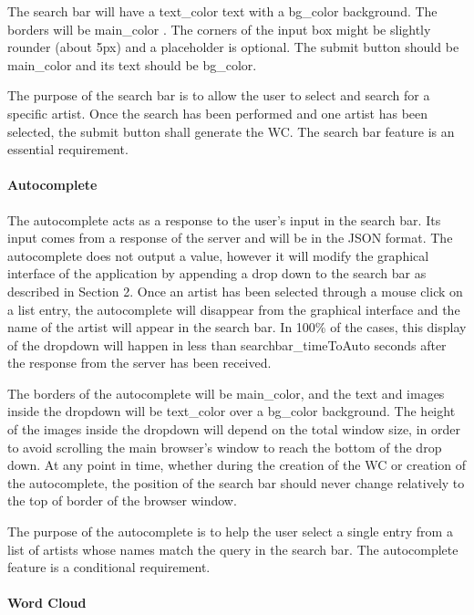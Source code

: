 \documentclass[]{article}
\begin{document}
The search bar will have a text\_color text with a bg\_color background.
The borders will be main\_color . The corners of the input box might be
slightly rounder (about 5px) and a placeholder is optional. The submit
button should be main\_color and its text should be bg\_color.

The purpose of the search bar is to allow the user to select and search
for a specific artist. Once the search has been performed and one artist
has been selected, the submit button shall generate the WC. The search
bar feature is an essential requirement.

\paragraph{Autocomplete}\label{autocomplete}

The autocomplete acts as a response to the user's input in the search
bar. Its input comes from a response of the server and will be in the
JSON format. The autocomplete does not output a value, however it will
modify the graphical interface of the application by appending a drop
down to the search bar as described in Section 2. Once an artist has
been selected through a mouse click on a list entry, the autocomplete
will disappear from the graphical interface and the name of the artist
will appear in the search bar. In 100\% of the cases, this display of
the dropdown will happen in less than searchbar\_timeToAuto seconds
after the response from the server has been received.

The borders of the autocomplete will be main\_color, and the text and
images inside the dropdown will be text\_color over a bg\_color
background. The height of the images inside the dropdown will depend on
the total window size, in order to avoid scrolling the main browser's
window to reach the bottom of the drop down. At any point in time,
whether during the creation of the WC or creation of the autocomplete,
the position of the search bar should never change relatively to the top
of border of the browser window.

The purpose of the autocomplete is to help the user select a single
entry from a list of artists whose names match the query in the search
bar. The autocomplete feature is a conditional requirement.

\paragraph{Word Cloud}\label{word-cloud}
\end{document}
